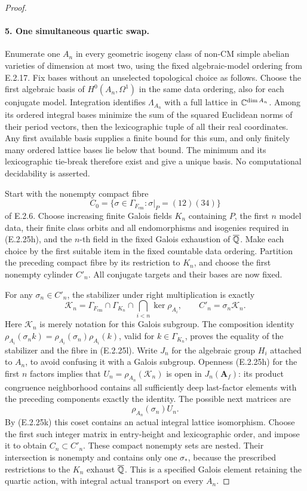 \begin{proof}
\paragraph{5. One simultaneous quartic swap.}
Enumerate one \(A_n\) in every geometric isogeny
class of non-CM simple abelian varieties of dimension
at most two, using the fixed algebraic-model ordering
from E.2.17. Fix bases without an unselected
topological choice as follows. Choose the first
algebraic basis of \(H^0(A_n,\Omega^1)\) in the
same data ordering, also for each conjugate model.
Integration identifies \(\Lambda_{A_n}\) with a
full lattice in \(\mathbb C^{\dim A_n}\). Among its
ordered integral bases minimize the sum of the
squared Euclidean norms of their period vectors,
then the lexicographic tuple of all their real
coordinates. Any first available basis supplies
a finite bound for this sum, and only finitely
many ordered lattice bases lie below that bound.
The minimum and its lexicographic tie-break
therefore exist and give a unique basis. No computational
decidability is asserted.

Start with the nonempty compact fibre
\[
 C_0=\{\sigma\in\Gamma_{F_{\mathrm{cm}}}:
                         \sigma|_P=(12)(34)\}
\]
of E.2.6. Choose increasing finite Galois fields
\(K_n\) containing \(P\), the first \(n\) model
data, their finite class orbits and all endomorphisms
and isogenies required in (E.2.25h), and the \(n\)-th
field in the fixed Galois exhaustion of \(\overline{\mathbb Q}\).
Make each choice by the first suitable item in the
fixed countable data ordering. Partition the
preceding compact fibre by its restriction to
\(K_n\), and choose the first nonempty cylinder
\(C'_n\). All conjugate targets and their bases
are now fixed.

For any \(\sigma_n\in C'_n\), the stabilizer under
right multiplication is exactly
\[
 \mathcal K_n=\Gamma_{F_{\mathrm{cm}}}\cap\Gamma_{K_n}
                   \cap\bigcap_{i<n}\ker\rho_{A_i},
 \qquad C'_n=\sigma_n\mathcal K_n.
 \tag{E.2.25l}
\]
Here \(\mathcal K_n\) is merely notation for this
Galois subgroup. The composition identity
\(\rho_{A_i}(\sigma_n k)
=\rho_{A_i}(\sigma_n)\rho_{A_i}(k)\), valid for
\(k\in\Gamma_{K_n}\), proves the equality of
the stabilizer and the fibre in (E.2.25l).
Write \(J_n\) for the algebraic group \(H_i\)
attached to \(A_n\), to avoid confusing it with
a Galois subgroup. Openness (E.2.25h) for the first
\(n\) factors implies that
\(U_n=\rho_{A_n}(\mathcal K_n)\) is open in
\(J_n(\mathbf A_f)\): its product congruence
neighborhood contains all sufficiently deep
last-factor elements with the preceding components
exactly the identity. The possible next matrices are
\[
 \rho_{A_n}(\sigma_n)U_n.
 \tag{E.2.25m}
\]
By (E.2.25k) this coset contains an actual integral
lattice isomorphism. Choose the first such integer
matrix in entry-height and lexicographic order,
and impose it to obtain \(C_n\subset C'_n\).
These compact nonempty sets are nested. Their
intersection is nonempty and contains only one
\(\sigma_*\), because the prescribed restrictions
to the \(K_n\) exhaust \(\overline{\mathbb Q}\). This is a
specified Galois element retaining the quartic
action, with integral actual transport on every
\(A_n\).


\end{proof}
